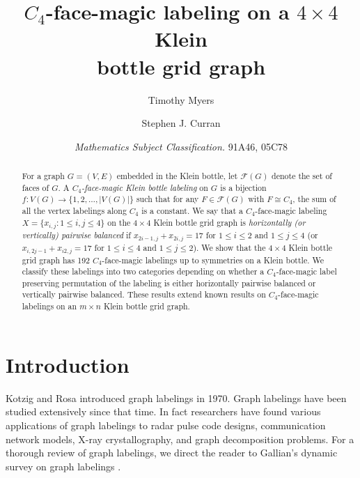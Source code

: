 \documentclass[10pt, reqno]{amsart}
\theoremstyle{definition}
\theoremstyle{plain}
\begin{document}
\title[$C_4$-face-magic labelings on a $4 \times 4$ Klein 
bottle grid graph]{$C_4$-face-magic labeling on a 
$4 \times 4$ Klein \\
bottle grid graph}
\author{Timothy Myers}
\address{Department of Mathematics,
         Howard University,
         Washington, DC 20059
         USA}
\author{Stephen J. Curran}
\address{Department of Mathematics,
         University of Pittsburgh at Johnstown,
         450 Schoolhouse Rd,
         Johnstown, PA 15904
         USA}

\date{ \textit{Mathematics Subject Classification.} 91A46, 05C78}

\begin{abstract}
For a graph $G = (V, E)$ embedded in the Klein bottle, let $\mathcal{F}(G)$ denote the set of faces of $G$.
A \textit{$C_4$-face-magic Klein bottle labeling} on $G$
is a bijection $f: V(G) \to \{1, 2, \dots, |V(G)|\}$
such that for any $F \in \mathcal{F}(G)$ with $F \cong C_4$, 
the sum of all the vertex labelings along $C_4$ is a constant. 
We say that a $C_4$-face-magic labeling
$X=\{x_{i,j} : 1\le i,j\le 4\}$ on the
$4\times 4$ Klein bottle grid graph is
\textit{horizontally (or vertically) pairwise balanced}
if $x_{2i-1,j} + x_{2i,j}=17$ for $1\le i \le 2$
and $1\le j \le 4$
(or $x_{i,2j-1} + x_{i2,j}=17$ for $1\le i \le 4$
and $1\le j \le 2$).
We show that the $4\times 4$ Klein bottle grid graph has
192 $C_4$-face-magic labelings up to symmetries on
a Klein bottle.
We classify these labelings into two categories
depending on whether a $C_4$-face-magic label preserving 
permutation of the labeling is either horizontally
pairwise balanced or vertically pairwise balanced.
These results extend known results on $C_4$-face-magic
labelings on an $m\times n$ Klein bottle grid graph.
\end{abstract}


\maketitle

\section{Introduction}

Kotzig and Rosa \cite{Kotzig} introduced graph labelings in 1970.
Graph labelings have been studied extensively since that time. 
In fact researchers \cite{SaviyoEtAl2023} have found various applications of graph labelings
to radar pulse code designs, communication network 
models, X-ray crystallography, and graph decomposition problems. 
For a thorough review of graph labelings, we direct the reader to Gallian’s dynamic
survey on graph labelings \cite{Gallian}.
\end{document}
